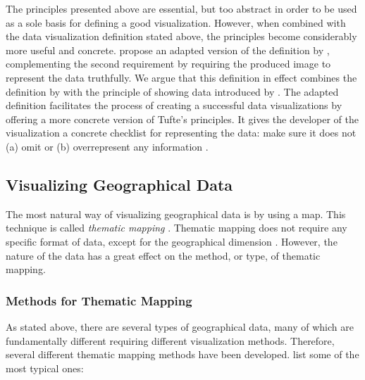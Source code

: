 The principles presented above are essential, but too abstract in order to be used as a sole basis for defining a good visualization. However, when combined with the data visualization definition stated above, the principles become considerably more useful and concrete. \citet{azzam_j-b_2013} propose an adapted version of the definition by \citet{kosara_visualization_2007}, complementing the second requirement by requiring the produced image to represent the data truthfully. We argue that this definition in effect combines the definition by \citet{kosara_visualization_2007} with the principle of showing data introduced by \citet{tufte_visual_1986}. The adapted definition facilitates the process of creating a successful data visualizations by offering a more concrete version of Tufte's principles. It gives the developer of the visualization a concrete checklist for representing the data: make sure it does not (a) omit or (b)  overrepresent any information \citep{azzam_j-b_2013}.



\subsection{Visualizing Geographical Data}

The most natural way of visualizing geographical data is by using a map\citep[chap.~1]{kraak_cartography_2011}. This technique is called \emph{thematic mapping} \citep[chap.~1]{slocum_thematic_2014}. Thematic mapping does not require any specific format of data, except for the geographical dimension \citep[chap.~1]{kraak_cartography_2011}. However, the nature of the data has a great effect on the method, or type, of thematic mapping.

\subsubsection{Methods for Thematic Mapping}

As stated above, there are several types of geographical data, many of which are fundamentally different requiring different visualization methods. Therefore, several different thematic mapping methods have been developed. \citet[chap.~14-18]{slocum_thematic_2014} list some of the most typical ones: 

